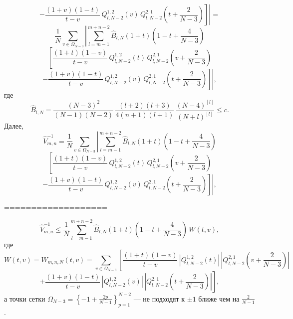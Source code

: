 \documentclass[12pt]{book}
\begin{document}
\begin{equation*}
\left.
\left.
  - \frac{(1+v)(1-t)}
    {t-v}
    \,Q^{1,2}_{l,N-2}\left(v\right)
    \,Q^{2,1}_{l,N-2}\left(t+\frac{2}{N-3}\right)
\right]
\right| =
\end{equation*}
\begin{equation*}
\frac{1}{N}
 \sum_{v\in\Omega_{N-3}} \left|
 \sum_{l=m-1}^{m+n-2}
 \hat{B}_{l,N}
 \left( 1+t\right)\left(1-t+\frac{4}{N-3}\right)
  \right.
\end{equation*}
\begin{equation*}
\left.
  \left[
    \frac{(1+t)(1-v)}
    {t-v}
    \,Q^{1,2}_{l,N-2}\left(t\right)
    \,Q^{2,1}_{l,N-2}\left(v+\frac{2}{N-3}\right)
  \right.
  \right.
\end{equation*}
\begin{equation*}
\left.
\left.
  - \frac{(1+v)(1-t)}
    {t-v}
    \,Q^{1,2}_{l,N-2}\left(v\right)
    \,Q^{2,1}_{l,N-2}\left(t+\frac{2}{N-3}\right)
\right]
\right|,
\end{equation*}
где
$$\hat{B}_{l,N} = \frac{(N-3)^2}{(N-1)(N-2)}\,\frac{(l+2)(l+3)}{4(n+1)(l+1)}\,\frac{(N-4)^{[l]}}{(N+l)^{[l]}} \leq c.$$
Далее,
\begin{equation*}
   \hat{V}^{-1}_{m,n}  =
\frac{1}{N}
 \sum_{v\in\Omega_{N-3}} \left|
 \sum_{l=m-1}^{m+n-2}
 \hat{B}_{l,N}
 \left( 1+t\right)\left(1-t+\frac{4}{N-3}\right)
  \right.
\end{equation*}
\begin{equation*}
\left.
  \left[
    \frac{(1+t)(1-v)}
    {t-v}
    \,Q^{1,2}_{l,N-2}\left(t\right)
    \,Q^{2,1}_{l,N-2}\left(v+\frac{2}{N-3}\right)
  \right.
  \right.
\end{equation*}
\begin{equation*}
\left.
\left.
  - \frac{(1+v)(1-t)}
    {t-v}
    \,Q^{1,2}_{l,N-2}\left(v\right)
    \,Q^{2,1}_{l,N-2}\left(t+\frac{2}{N-3}\right)
\right]
\right|,
\end{equation*}

===================
\newpage
\newpage


\begin{equation*}
   \hat{V}^{-1}_{m,n}  \leq
\frac{1}{N}
 \sum_{l=m-1}^{m+n-2}
 \hat{B}_{l,N}
 \left( 1+t\right)\left(1-t+\frac{4}{N-3}\right)\, W(t,v),
\end{equation*}
где
\begin{equation*}
W(t,v) = W_{m,n,N}(t,v)=
\sum_{v\in \Omega_{N-3}}
  \left[
    \frac{(1+t)(1-v)}
    {t-v}\,
    \left| Q^{1,2}_{l,N-2}\left(t\right)\right|\,
    \left| Q^{2,1}_{l,N-2}\left(v+\frac{2}{N-3}\right)
  \right|
  \right.
\end{equation*}
\begin{equation*}
\left.
  + \frac{(1+v)(1-t)}
    {t-v}
    \,
    \left| Q^{1,2}_{l,N-2}\left(v\right) \right|\,
    \left|Q^{2,1}_{l,N-2}\left(t+\frac{2}{N-3}\right)
    \right|
\right],
\end{equation*}
а точки сетки $\Omega_{N-3} = \left\{ -1 + \frac{2p}{N-1}\right\}_{p=1}^{N-2}$ --- не подходят к $\pm 1$ ближе чем на $\frac{2}{N-1}$.
\end{document}
